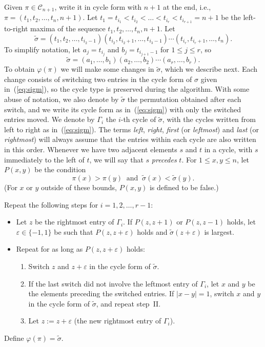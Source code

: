 \documentclass[11pt]{amsart}
\newcommand\beq{\begin{equation}}
\newcommand\eeq{\end{equation}}
\newcommand\ben{\begin{enumerate}}
\newcommand\een{\end{enumerate}}
\newcommand\bit{\begin{itemize}}
\newcommand\eit{\end{itemize}}
\newcommand\ms{\medskip}
\newcommand\C{\mathcal C}
\newcommand\wt{\widetilde}
\newcommand\bij{\varphi}
\newcommand\eps{\varepsilon}
\newcommand\sigm{\wt\sigma}
\begin{document}
Given $\pi\in\C_{n+1}$, write it in cycle form with $n+1$ at the end, i.e., $\pi=(t_1,t_2,\dots,t_n,n+1)$. Let $t_1=t_{i_1}<t_{i_2}<\dots<t_{i_r}<t_{i_{r+1}}=n+1$ be the left-to-right maxima of the
sequence $t_1,t_2,\dots,t_n,n+1$. Let $$\sigm=(t_{1},t_2,\dots,t_{i_2-1})(t_{i_2},t_{i_2+1},\dots,t_{i_3-1})\cdots(t_{i_r},t_{i_r+1},\dots,t_n).$$ To simplify notation, let $a_j=t_{i_j}$ and $b_j=t_{i_{j+1}-1}$ for $1\le j\le r$,
so \beq\label{eq:sigm}\sigm=(a_1,\dots,b_1)(a_2,\dots,b_2)\cdots(a_r,\dots,b_r).\eeq
To obtain $\bij(\pi)$ we will make some changes in $\sigm$, which we describe next. Each change consists of switching two entries in the cycle form of $\sigma$ given in~(\ref{eq:sigm}),
so the cycle type is preserved during the algorithm.
With some abuse of notation, we also denote by $\sigm$ the permutation obtained after each switch, and we write its cycle form as in~(\ref{eq:sigm}) with only the switched entries moved.
We denote by $\Gamma_i$ the $i$-th cycle of $\sigm$, with the cycles written from left to right as in~(\ref{eq:sigm}).
The terms {\em left}, {\em right}, {\em first} (or {\em leftmost}) and {\em last} (or {\em rightmost}) will always assume that the entries within each cycle are also written in this order.
Whenever we have two adjacent elements $s$ and $t$ in a cycle, with $s$ immediately to the left of $t$,
we will say that $s$ {\em precedes} $t$.
For $1\le x,y\le n$, let $P(x,y)$ be the condition
$$\pi(x)>\pi(y) \ \textrm{ and }\  \sigm(x)<\sigm(y).$$
(For $x$ or $y$ outside of these bounds, $P(x,y)$ is defined to be false.)\ms

Repeat the following steps for $i=1,2,\dots,r-1$:
\bit
\item Let $z$ be the rightmost entry of $\Gamma_i$.
If $P(z,z+1)$ or $P(z,z-1)$ holds, let $\eps\in\{-1,1\}$ be such that $P(z,z+\eps)$ holds and $\sigm(z+\eps)$ is largest.
\item Repeat for as long as $P(z,z+\eps)$ holds:
\ben\renewcommand{\labelenumi}{\Roman{enumi}.}
\item\label{it:a} Switch $z$ and $z+\eps$ in the cycle form of $\sigm$.
\item\label{it:b} If the last switch did not involve the leftmost entry of $\Gamma_i$, let $x$ and $y$ be the elements preceding the switched entries.
If $|x-y|=1$, switch $x$ and $y$ in the cycle form of $\sigm$, and repeat step~II.
\item Let $z:=z+\eps$ (the new rightmost entry of $\Gamma_i$).
\een
\eit

Define $\bij(\pi)=\sigm$.
\end{document}
